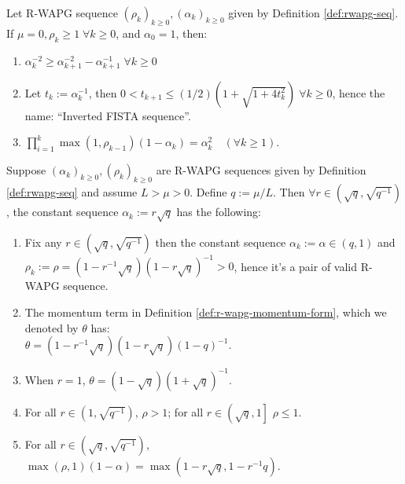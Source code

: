 \documentclass[12pt]{article}
\begin{document}
        \begin{lemma}\label{lemma:inverted-fista-seq}
            Let R-WAPG sequence $(\rho_k)_{k \ge 0}, (\alpha_k)_{k \ge 0}$ given by Definition \ref{def:rwapg-seq}. 
            If $\mu = 0, \rho_k \ge 1\; \forall k \ge 0$, and $\alpha_0 = 1$, then: 
            \begin{enumerate}
                \item $\alpha_k^{-2} \ge \alpha_{k + 1}^{-2} - \alpha_{k + 1}^{-1}\; \forall k \ge 0$
                \item Let $t_k := \alpha_k^{-1}$, then $0 < t_{k + 1} \le (1/2)\left(1 + \sqrt{1 + 4t_k^2}\right)\;\forall k\ge 0$, hence the name: ``Inverted FISTA sequence''. 
                \item $\prod_{i = 1}^k\max(1, \rho_{k - 1})(1 - \alpha_k) = \alpha_k^2 \quad (\forall k \ge 1)$. 
            \end{enumerate}
        \end{lemma}
        \begin{lemma}\label{lemma:constant-rwapg-seq}
            Suppose $(\alpha_k)_{k \ge 0}, (\rho_k)_{k \ge 0}$ are R-WAPG sequences given by Definition \ref{def:rwapg-seq} and assume $L > \mu > 0$.
            Define $q := \mu/L$. 
            Then $\forall r \in \left(\sqrt{q},\sqrt{q^{-1}}\right)$, the constant sequence $\alpha_k := r \sqrt{q}$ has the following: 
            \begin{enumerate}
                \item Fix any $r \in \left(\sqrt{q}, \sqrt{q^{-1}}\right)$ then the constant sequence $\alpha_k := \alpha \in (q, 1)$ and\\
                $\rho_k := \rho=\left(1-r^{-1}\sqrt{q}\right)\left(1 - r \sqrt{q}\right)^{-1} > 0$, hence it's a pair of valid R-WAPG sequence. 
                \item The momentum term in Definition \ref{def:r-wapg-momentum-form}, which we denoted by $\theta$ has:\\ $\theta = (1 - r^{-1}\sqrt{q})(1 - r\sqrt{q})(1- q)^{-1}$. 
                \item When $r = 1$, $\theta = (1- \sqrt{q})(1 + \sqrt{q})^{-1}$. 
                \item For all $r \in \left(1, \sqrt{q^{-1}}\right)$, $\rho > 1$; for all $r \in \left(\sqrt{q}, 1\right]$ $\rho \le 1$. 
                \item For all $r \in \left(\sqrt{q}, \sqrt{q^{-1}}\right)$, $\max(\rho, 1)(1 - \alpha) = \max\left(1 - r\sqrt{q}, 1 - r^{-1}q\right)$. 
            \end{enumerate}
        \end{lemma}
\end{document}
